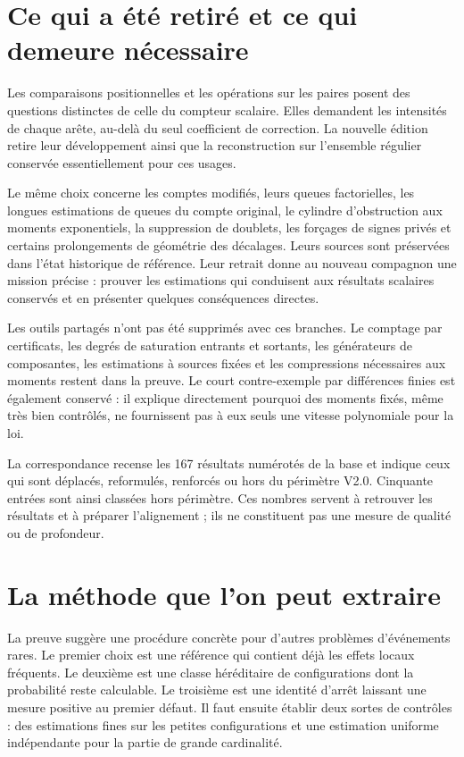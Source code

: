 \documentclass[11pt,a4paper]{article}
\begin{document}
\section{Ce qui a été retiré et ce qui demeure nécessaire}

Les comparaisons positionnelles et les opérations sur les paires posent des questions distinctes de celle du compteur scalaire. Elles demandent les intensités de chaque arête, au-delà du seul coefficient de correction. La nouvelle édition retire leur développement ainsi que la reconstruction sur l'ensemble régulier conservée essentiellement pour ces usages.

Le même choix concerne les comptes modifiés, leurs queues factorielles, les longues estimations de queues du compte original, le cylindre d'obstruction aux moments exponentiels, la suppression de doublets, les forçages de signes privés et certains prolongements de géométrie des décalages. Leurs sources sont préservées dans l'état historique de référence. Leur retrait donne au nouveau compagnon une mission précise : prouver les estimations qui conduisent aux résultats scalaires conservés et en présenter quelques conséquences directes.

Les outils partagés n'ont pas été supprimés avec ces branches. Le comptage par certificats, les degrés de saturation entrants et sortants, les générateurs de composantes, les estimations à sources fixées et les compressions nécessaires aux moments restent dans la preuve. Le court contre-exemple par différences finies est également conservé : il explique directement pourquoi des moments fixés, même très bien contrôlés, ne fournissent pas à eux seuls une vitesse polynomiale pour la loi.

La correspondance recense les 167 résultats numérotés de la base et indique ceux qui sont déplacés, reformulés, renforcés ou hors du périmètre V2.0. Cinquante entrées sont ainsi classées hors périmètre. Ces nombres servent à retrouver les résultats et à préparer l'alignement ; ils ne constituent pas une mesure de qualité ou de profondeur.

\section{La méthode que l'on peut extraire}

La preuve suggère une procédure concrète pour d'autres problèmes d'événements rares. Le premier choix est une référence qui contient déjà les effets locaux fréquents. Le deuxième est une classe héréditaire de configurations dont la probabilité reste calculable. Le troisième est une identité d'arrêt laissant une mesure positive au premier défaut. Il faut ensuite établir deux sortes de contrôles : des estimations fines sur les petites configurations et une estimation uniforme indépendante pour la partie de grande cardinalité.
\end{document}
